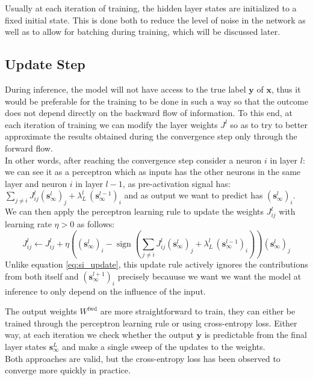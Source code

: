 \documentclass[a4paper,12pt]{report}
\begin{document}
Usually at each iteration of training, the hidden layer states are initialized to a 
fixed initial state. This is done both to reduce the level of noise in the network as
well as to allow for batching during training, which will be discussed later.

\subsection{Update Step}
During inference, the model will not have access to the true label $\mathbf{y}$ of 
$\mathbf{x}$, thus it would be preferable for the training to be done in such a way
so that the outcome does not depend directly on the backward flow of information.
To this end, at each iteration of training we can modify the layer weights $J^l$ 
so as to try to better approximate the results obtained during the convergence step
only through the forward flow. \\
In other words, after reaching the convergence step consider a neuron $i$ in layer 
$l$: we can see it as a perceptron which as inputs has the other neurons in the same 
layer and neuron $i$ in layer $l-1$, as pre-activation signal has: $\sum_{j \neq i} 
J_{ij}^l \left(\mathbf{s}^{l}_{\infty}\right)_j + \lambda_L^l\, 
\left(\mathbf{s}^{l-1}_{\infty}\right)_i$ and as output we want to predict has 
$\left(\mathbf{s}^{l}_{\infty}\right)_i$. We can then apply the perceptron learning
rule to update the weights $J_{ij}^l$ with learning rate $\eta > 0$ as follows:
\begin{equation}
    J_{ij}^l \leftarrow J_{ij}^l + \eta \left(\left(\mathbf{s}^{l}_{\infty}\right)_i -
    \operatorname{sign}\left(\sum_{j \neq i} J_{ij}^l
    \left(\mathbf{s}^{l}_{\infty}\right)_j + \lambda_L^l\,
    \left(\mathbf{s}^{l-1}_{\infty}\right)_i\right)\right)
    \left(\mathbf{s}^{l}_{\infty}\right)_j
\end{equation}
Unlike equation \ref{eq:si_update}, this update rule actively ignores the contributions
from both itself and $\left(\mathbf{s}^{l+1}_{\infty}\right)_i$ precisely becauuse we 
want we want the model at inference to only depend on the influence of the input. 
\vspace{0.5em}

The output weights $W^{\mathrm{fwd}}$ are more straightforward to train, they can 
either be trained through the perceptron learning rule or using cross-entropy loss. 
Either way, at each iteration we check whether the output $\mathbf{y}$ is predictable 
from the final layer states $\mathbf{s}^{L}_{\infty}$ and make a single sweep of the 
updates to the weights. \\
Both approaches are valid, but the cross-entropy loss has been observed to converge 
more quickly in practice.
\end{document}
